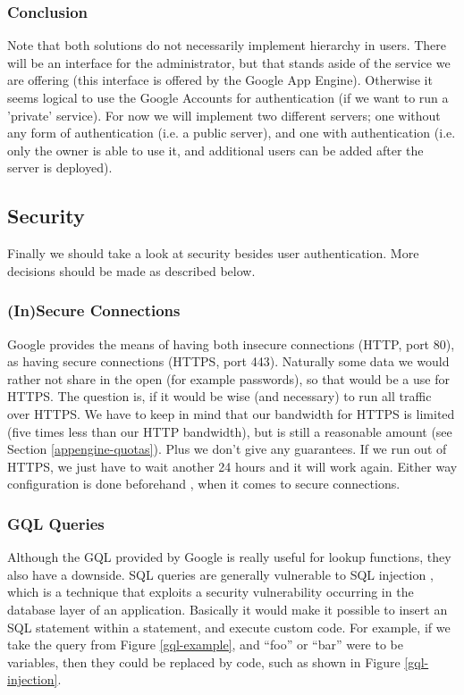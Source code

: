 \subsubsection{Conclusion}
Note that both solutions do not necessarily implement hierarchy in users. There
will be an interface for the administrator, but that stands aside of the service
we are offering (this interface is offered by the Google App Engine). Otherwise
it seems logical to use the Google Accounts for authentication (if we want to run
a 'private' service). For now we will implement two different servers; one
without any form of authentication (i.e. a public server), and one with
authentication (i.e. only the owner is able to use it, and additional users can
be added after the server is deployed).

\subsection{Security}
\label{server-design-security}
Finally we should take a look at security besides user authentication. More
decisions should be made as described below.

\subsubsection{(In)Secure Connections}
Google provides the means of having both insecure connections (HTTP, port 80), as
having secure connections (HTTPS, port 443). Naturally some data we would rather
not share in the open (for example passwords), so that would be a use for HTTPS.
The question is, if it would be wise (and necessary) to run all traffic over
HTTPS. We have to keep in mind that our bandwidth for HTTPS is limited (five
times less than our HTTP bandwidth), but is still a reasonable amount (see
Section \ref{appengine-quotas}). Plus we don't give any guarantees. If we run
out of HTTPS, we just have to wait another 24 hours and it will work again. Either way
configuration is done beforehand , when it comes to secure connections.

\subsubsection{GQL Queries}
Although the GQL provided by Google is really useful for lookup functions, they
also have a downside. SQL queries are generally vulnerable to SQL injection ,
which is a technique that exploits a security vulnerability occurring in the
database layer of an application. Basically it would make it possible to insert
an SQL statement within a statement, and execute custom code. For example, if we
take the query from Figure \ref{gql-example}, and ``foo'' or ``bar'' were to be variables, then they could be replaced by
code, such as shown in Figure \ref{gql-injection}.

